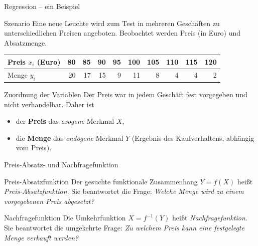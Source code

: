 \documentclass[aspectratio=169,11pt]{beamer}
\begin{document}
\begin{frame}{Regression -- ein Beispiel}
  \begin{block}{Szenario}
    Eine neue Leuchte wird zum Test in mehreren Geschäften zu
    unterschiedlichen Preisen angeboten. Beobachtet werden Preis
    (in Euro) und Absatzmenge.
  \end{block}

  \medskip

  \begin{center}
    \begin{tabular}{l*{9}{r}}
      \toprule
      Preis $x_i$ (Euro)  & 80 & 85 & 90 & 95 & 100 & 105 & 110 & 115 & 120 \\
      \midrule
      Menge $y_i$         & 20 & 17 & 15 & 9  & 11  & 8   & 4   & 4   & 2   \\
      \bottomrule
    \end{tabular}
  \end{center}

  \medskip

  \begin{exampleblock}{Zuordnung der Variablen}
    Der Preis war in jedem Geschäft fest vorgegeben und nicht verhandelbar.
    Daher ist
    \begin{itemize}
      \item der \textbf{Preis} das \emph{exogene} Merkmal $X$,
      \item die \textbf{Menge} das \emph{endogene} Merkmal $Y$
            (Ergebnis des Kaufverhaltens, abhängig vom Preis).
    \end{itemize}
  \end{exampleblock}
\end{frame}


\begin{frame}{Preis-Absatz- und Nachfragefunktion}
  \begin{block}{Preis-Absatzfunktion}
    Der gesuchte funktionale Zusammenhang $Y = f(X)$ heißt
    \emph{Preis-Absatzfunktion}. Sie beantwortet die Frage:
    \emph{Welche Menge wird zu einem vorgegebenen Preis abgesetzt?}
  \end{block}

  \medskip

  \begin{block}{Nachfragefunktion}
    Die Umkehrfunktion $X = f^{-1}(Y)$ heißt \emph{Nachfragefunktion}.
    Sie beantwortet die umgekehrte Frage: \emph{Zu welchem Preis kann
    eine festgelegte Menge verkauft werden?}
  \end{block}

  \end{frame}
\end{document}
